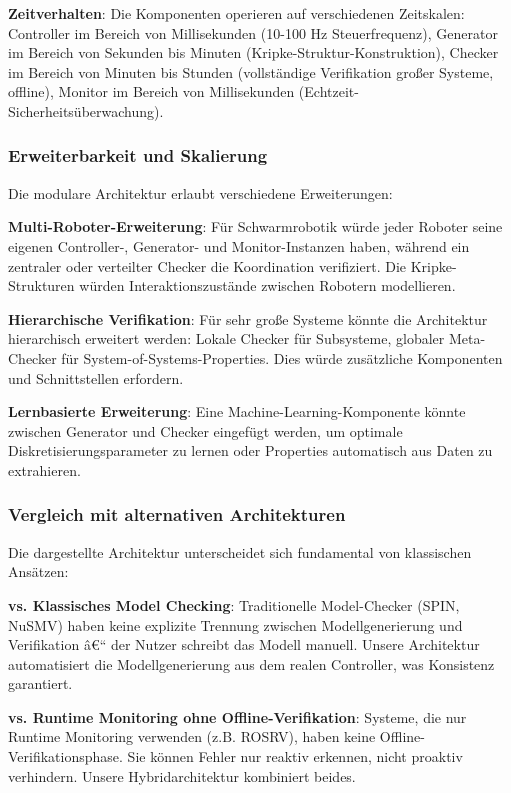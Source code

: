 ﻿\documentclass[a4paper,12pt]{article}
\theoremstyle{definition}
\begin{document}
\textbf{Zeitverhalten}: Die Komponenten operieren auf verschiedenen Zeitskalen: Controller im Bereich von Millisekunden (10-100 Hz Steuerfrequenz), Generator im Bereich von Sekunden bis Minuten (Kripke-Struktur-Konstruktion), Checker im Bereich von Minuten bis Stunden (vollständige Verifikation großer Systeme, offline), Monitor im Bereich von Millisekunden (Echtzeit-Sicherheitsüberwachung).

\subsubsection{Erweiterbarkeit und Skalierung}

Die modulare Architektur erlaubt verschiedene Erweiterungen:

\textbf{Multi-Roboter-Erweiterung}: Für Schwarmrobotik würde jeder Roboter seine eigenen Controller-, Generator- und Monitor-Instanzen haben, während ein zentraler oder verteilter Checker die Koordination verifiziert. Die Kripke-Strukturen würden Interaktionszustände zwischen Robotern modellieren.

\textbf{Hierarchische Verifikation}: Für sehr große Systeme könnte die Architektur hierarchisch erweitert werden: Lokale Checker für Subsysteme, globaler Meta-Checker für System-of-Systems-Properties. Dies würde zusätzliche Komponenten und Schnittstellen erfordern.

\textbf{Lernbasierte Erweiterung}: Eine Machine-Learning-Komponente könnte zwischen Generator und Checker eingefügt werden, um optimale Diskretisierungsparameter zu lernen oder Properties automatisch aus Daten zu extrahieren.

\subsubsection{Vergleich mit alternativen Architekturen}

Die dargestellte Architektur unterscheidet sich fundamental von klassischen Ansätzen:

\textbf{vs. Klassisches Model Checking}: Traditionelle Model-Checker (SPIN, NuSMV) haben keine explizite Trennung zwischen Modellgenerierung und Verifikation â€“ der Nutzer schreibt das Modell manuell. Unsere Architektur automatisiert die Modellgenerierung aus dem realen Controller, was Konsistenz garantiert.

\textbf{vs. Runtime Monitoring ohne Offline-Verifikation}: Systeme, die nur Runtime Monitoring verwenden (z.B. ROSRV), haben keine Offline-Verifikationsphase. Sie können Fehler nur reaktiv erkennen, nicht proaktiv verhindern. Unsere Hybridarchitektur kombiniert beides.
\end{document}
